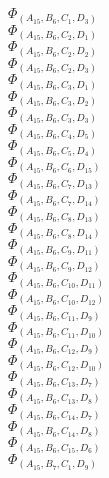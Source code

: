 \documentclass[14pt]{article}
\begin{document}
    $\Phi_{({A}_{15}, {B}_{6}, {C}_{1}, {D}_{3})}$ \\ 
    $\Phi_{({A}_{15}, {B}_{6}, {C}_{2}, {D}_{1})}$ \\ 
    $\Phi_{({A}_{15}, {B}_{6}, {C}_{2}, {D}_{2})}$ \\ 
    $\Phi_{({A}_{15}, {B}_{6}, {C}_{2}, {D}_{3})}$ \\ 
    $\Phi_{({A}_{15}, {B}_{6}, {C}_{3}, {D}_{1})}$ \\ 
    $\Phi_{({A}_{15}, {B}_{6}, {C}_{3}, {D}_{2})}$ \\ 
    $\Phi_{({A}_{15}, {B}_{6}, {C}_{3}, {D}_{3})}$ \\ 
    $\Phi_{({A}_{15}, {B}_{6}, {C}_{4}, {D}_{5})}$ \\ 
    $\Phi_{({A}_{15}, {B}_{6}, {C}_{5}, {D}_{4})}$ \\ 
    $\Phi_{({A}_{15}, {B}_{6}, {C}_{6}, {D}_{15})}$ \\ 
    $\Phi_{({A}_{15}, {B}_{6}, {C}_{7}, {D}_{13})}$ \\ 
    $\Phi_{({A}_{15}, {B}_{6}, {C}_{7}, {D}_{14})}$ \\ 
    $\Phi_{({A}_{15}, {B}_{6}, {C}_{8}, {D}_{13})}$ \\ 
    $\Phi_{({A}_{15}, {B}_{6}, {C}_{8}, {D}_{14})}$ \\ 
    $\Phi_{({A}_{15}, {B}_{6}, {C}_{9}, {D}_{11})}$ \\ 
    $\Phi_{({A}_{15}, {B}_{6}, {C}_{9}, {D}_{12})}$ \\ 
    $\Phi_{({A}_{15}, {B}_{6}, {C}_{10}, {D}_{11})}$ \\ 
    $\Phi_{({A}_{15}, {B}_{6}, {C}_{10}, {D}_{12})}$ \\ 
    $\Phi_{({A}_{15}, {B}_{6}, {C}_{11}, {D}_{9})}$ \\ 
    $\Phi_{({A}_{15}, {B}_{6}, {C}_{11}, {D}_{10})}$ \\ 
    $\Phi_{({A}_{15}, {B}_{6}, {C}_{12}, {D}_{9})}$ \\ 
    $\Phi_{({A}_{15}, {B}_{6}, {C}_{12}, {D}_{10})}$ \\ 
    $\Phi_{({A}_{15}, {B}_{6}, {C}_{13}, {D}_{7})}$ \\ 
    $\Phi_{({A}_{15}, {B}_{6}, {C}_{13}, {D}_{8})}$ \\ 
    $\Phi_{({A}_{15}, {B}_{6}, {C}_{14}, {D}_{7})}$ \\ 
    $\Phi_{({A}_{15}, {B}_{6}, {C}_{14}, {D}_{8})}$ \\ 
    $\Phi_{({A}_{15}, {B}_{6}, {C}_{15}, {D}_{6})}$ \\ 
    $\Phi_{({A}_{15}, {B}_{7}, {C}_{1}, {D}_{9})}$ \\ 
\end{document}
